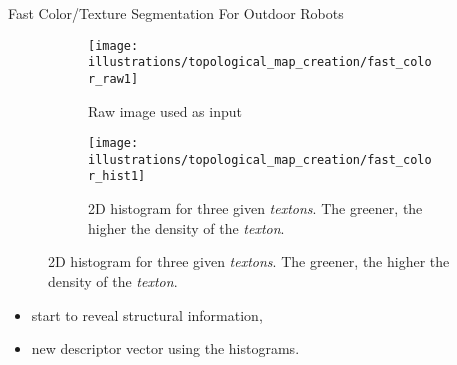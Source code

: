 \documentclass[aspectratio=169,hyperref={pdfpagelabels=false}]{beamer}
\begin{document}
    \begin{frame}{Fast Color/Texture Segmentation For Outdoor Robots}
        \begin{figure}[ht!]
            \centering
            \begin{subfigure}[t]{.29\textwidth}
                \texttt{[image: illustrations/topological\_map\_creation/fast\_color\_raw1]}
                \caption{Raw image used as input}
            \end{subfigure}
            \hfill
            \begin{subfigure}[t]{.69\textwidth}
                \texttt{[image: illustrations/topological\_map\_creation/fast\_color\_hist1]}
                \caption{2D histogram for three given \textit{textons}. The greener, the higher the density of the \textit{texton}.}
                \label{fig:fast_color:histograms}
            \end{subfigure}
        \end{figure}
        \begin{itemize}
            \item start to reveal structural information,
            \item new descriptor vector using the histograms.
        \end{itemize}
    \end{frame}
\end{document}
